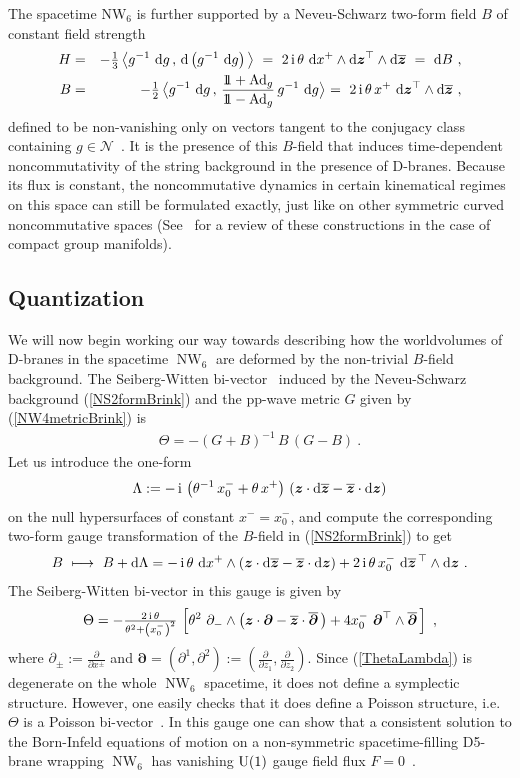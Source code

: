 \documentclass[11pt,a4paper]{article}
\DeclareMathOperator{\NW}{NW}
\def\nn{\nonumber}
\newcommand{\1}{\mathbb{1}}
\newcommand{\mbf}[1]{{\boldsymbol {#1} }}
\def\ii{{\,{\rm i}\,}}
\def\dd{{\rm d}}
\def\mz{{\mbf z}}
\def\mdell{{\mbf\partial}}
\newcommand{\id}{{1\!\!1}} %
\def\nn{\nonumber}
\def\bea{\begin{eqnarray}}
\def\eea{\end{eqnarray}}
\newcommand{\beq}{\begin{eqnarray}}
\newcommand{\eeq}{\end{eqnarray}}
\begin{document}
The spacetime NW$_6$ is further supported by a Neveu-Schwarz two-form
field $B$ of constant field strength
\bea
H&=&-\mbox{$\frac13$}\,\bigl\langle g^{-1}~\dd g\,,\,\dd
\left(g^{-1}~\dd g\right)\bigl\rangle
{}~=~2\ii\theta~\dd x^+\wedge\dd\mz^\top\wedge\dd\overline{\mz}
{}~=~\dd B \ , \nn\\
B&=&-\mbox{$\frac12$}\,\bigl\langle g^{-1}~\dd g\,,\,
\frac{\id+{\rm Ad}_g}{\id-{\rm Ad}_g}\,g^{-1}~\dd g\bigl\rangle~=~
2\ii\theta\,x^+~\dd\mz^\top\wedge\dd\overline{\mz} \ ,
\label{NS2formBrink}\eea
defined to be non-vanishing only on vectors tangent to the conjugacy
class containing $g\in\mathcal{N}$~\cite{AlekSch1}. It is the presence of
this $B$-field that induces time-dependent noncommutativity of the
string background in the presence of D-branes. Because its flux is
constant, the noncommutative dynamics in certain kinematical regimes
on this space can still be formulated exactly, just like on other
symmetric curved noncommutative spaces (See~\cite{Schomrev} for a
review of these constructions in the case of compact group
manifolds).

\subsection{Quantization\label{NWQuant}}

We will now begin working our way towards describing how
the worldvolumes of D-branes in the spacetime $\NW_6$ are
deformed by the non-trivial $B$-field background. The Seiberg-Witten
bi-vector~\cite{SW1} induced by the Neveu-Schwarz background
(\ref{NS2formBrink}) and the pp-wave metric $G$ given by
(\ref{NW4metricBrink}) is
\beq
\Theta=-(G+B)^{-1}\,B\,(G-B) \ .
\label{SWTheta}\eeq
Let us introduce the one-form
\beq
\Lambda:=-\ii\left(\theta^{-1}\,x_0^-+\theta\,x^+\right)\,\left(
\mz\cdot\dd\overline{\mz}-\overline{\mz}\cdot\dd\mz
\right)
\label{Lambdadef}\eeq
on the null hypersurfaces of constant $x^-=x_0^-$, and compute the
corresponding two-form gauge transformation of the $B$-field in
(\ref{NS2formBrink}) to get
\beq
B~\longmapsto~B+\dd\Lambda=-\ii\theta~\dd x^+\wedge\left(
\mz\cdot\dd\overline{\mz}-\overline{\mz}\cdot\dd\mz
\right)+2\ii\theta\,x_0^-~\dd\overline{\mz}{}^{\,\top}
\wedge\dd\mz \ .
\label{B6gaugeequiv}\eeq
The Seiberg-Witten bi-vector in this gauge is given by~\cite{HSz1}
\beq
\Theta=-\mbox{$\frac{2\ii\theta}{\theta^2+\left(x_0^-\right)^2}$}\,
\left[\theta^2~\partial_-\wedge\left(\mz\cdot\mdell-
\overline{\mz}\cdot\overline{\mdell}\,\right)+4x_0^-~
\mdell^\top\wedge\overline{\mdell}\,\right] \ ,
\label{ThetaLambda}\eeq
where $\partial_\pm:=\frac\partial{\partial x^\pm}$ and
$\mdell=(\partial^1,\partial^2):=(\frac\partial{\partial
  z_1},\frac\partial{\partial z_2})$. Since (\ref{ThetaLambda}) is
degenerate on the whole $\NW_6$ spacetime, it does not define a
symplectic structure. However, one easily checks that it does define a
Poisson structure, i.e. $\Theta$ is a Poisson
bi-vector~\cite{HSz1}. In this gauge one can show that a consistent
solution to the Born-Infeld equations of motion on a non-symmetric
spacetime-filling D5-brane wrapping $\NW_6$ has vanishing ${\rm U}(1)$
gauge field flux $F=0$~\cite{HashTh2}.
\end{document}
